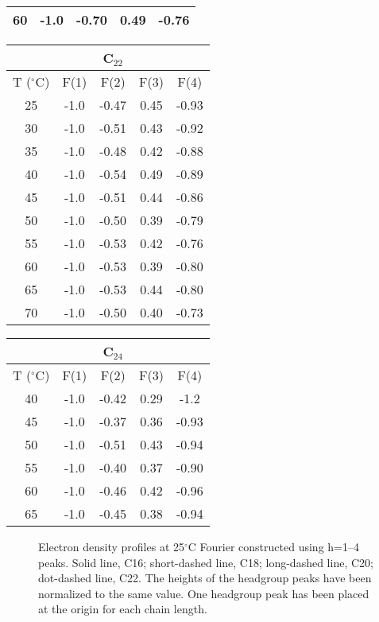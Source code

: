 \begin{table}
\begin{center}
\begin{tabular}{ccccc}
60 & -1.0 & -0.70 & 0.49 & -0.76 \\
\hline \hline
\end{tabular}
\raggedright
\hspace{0.2in}
\begin{tabular}{ccccc}
\\ \hline \hline
 & & C$_{22}$ & & \\ \hline
T ($^{\circ}$C) & F(1) & F(2) & F(3) & F(4) \\ \hline
25 & -1.0 & -0.47 & 0.45 & -0.93 \\
30 & -1.0 & -0.51 & 0.43 & -0.92 \\
35 & -1.0 & -0.48 & 0.42 & -0.88 \\
40 & -1.0 & -0.54 & 0.49 & -0.89 \\
45 & -1.0 & -0.51 & 0.44 & -0.86 \\
50 & -1.0 & -0.50 & 0.39 & -0.79 \\
55 & -1.0 & -0.53 & 0.42 & -0.76 \\
60 & -1.0 & -0.53 & 0.39 & -0.80 \\
65 & -1.0 & -0.53 & 0.44 & -0.80 \\
70 & -1.0 & -0.50 & 0.40 & -0.73 \\
\hline \hline
\end{tabular}
\end{center}
\begin{center}
\hspace{0.1in}
\begin{tabular}{ccccc}
\\ \hline \hline
 & & C$_{24}$ & & \\ \hline
T ($^{\circ}$C) & F(1) & F(2) & F(3) & F(4) \\ \hline
40 & -1.0 & -0.42 & 0.29 & -1.2 \\
45 & -1.0 & -0.37 & 0.36 & -0.93 \\
50 & -1.0 & -0.51 & 0.43 & -0.94 \\
55 & -1.0 & -0.40 & 0.37 & -0.90 \\
60 & -1.0 & -0.46 & 0.42 & -0.96 \\
65 & -1.0 & -0.45 & 0.38 & -0.94 \\
\hline \hline
\end{tabular}
\end{center}
\end{table}

\begin{figure}
\centerline {}
\caption{Electron density profiles at 25$^{\circ}$C Fourier constructed using
h=1--4 peaks. 
Solid line, C16; 
short-dashed line, C18; long-dashed line, C20; dot-dashed line, C22.
The heights of the headgroup peaks have been normalized to the same
value. One headgroup peak has been placed at the origin for each chain
length. 
\label{gel_edp}}
\end{figure}

